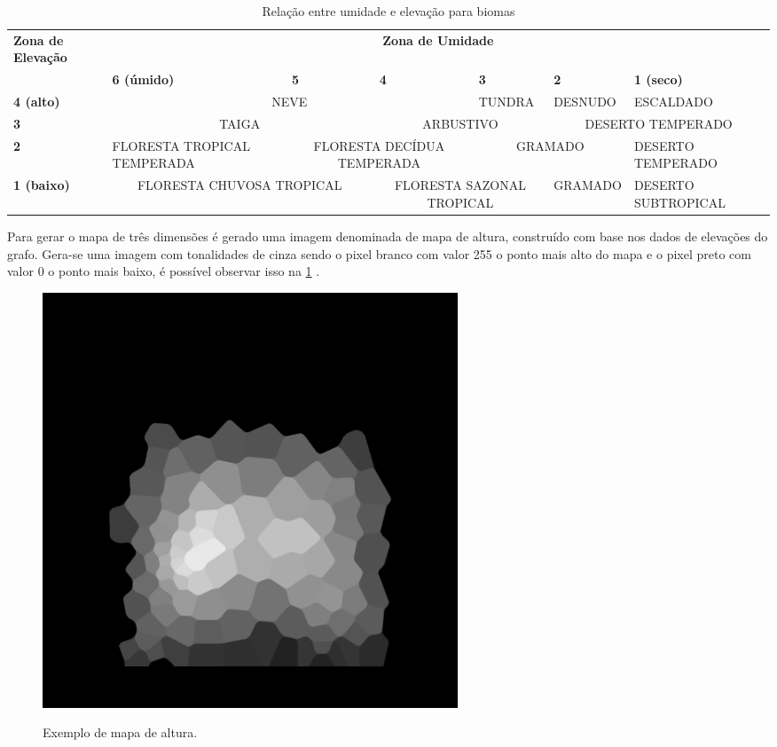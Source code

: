 \begin{table}
	\centering
	\caption{Relação entre umidade e elevação para biomas}
	\label{tab:biomes}
	\begin{tabularx}{\textwidth}{|X|X|X|X|X|X|X|}
	\hline
	\textbf{Zona de Elevação} & \multicolumn{6}{c|}{\textbf{Zona de Umidade}} \\
	\cline{2-7}
	 & \textbf{6 (úmido)} & \textbf{5} & \textbf{4} & \textbf{3} & \textbf{2} & \textbf{1 (seco)} \\
	\hline
	\textbf{4 (alto)} & \multicolumn{3}{|c|}{NEVE} & TUNDRA & DESNUDO & ESCALDADO  \\
	\hline
	\textbf{3} & \multicolumn{2}{|c|}{TAIGA} & \multicolumn{2}{|c|}{ARBUSTIVO} & \multicolumn{2}{|c|}{DESERTO TEMPERADO} \\
	\hline
	\textbf{2} & FLORESTA TROPICAL TEMPERADA & \multicolumn{2}{|c|}{FLORESTA DECÍDUA TEMPERADA} & \multicolumn{2}{|c|}{GRAMADO} & DESERTO TEMPERADO  \\
	\hline
	\textbf{1 (baixo)} &  \multicolumn{2}{|c|}{FLORESTA CHUVOSA TROPICAL} & \multicolumn{2}{|c|}{FLORESTA SAZONAL TROPICAL} & GRAMADO & DESERTO SUBTROPICAL  \\
	\hline
	\end{tabularx}
\end{table}

Para gerar o mapa de três dimensões é gerado uma imagem denominada de mapa de altura, construído com base nos dados de elevações do grafo. Gera-se uma imagem com tonalidades de cinza sendo o pixel branco com valor 255 o ponto mais alto do mapa e o pixel preto com valor 0 o ponto mais baixo, é possível observar isso na \cref{fig:heightmap} \cite{planetzoo}.

\begin{figure}[!ht]
	\centering
    \caption{Exemplo de mapa de altura.}
	\includegraphics[width=0.6\textwidth]{figures/heightmap_eample.png}
	\label{fig:heightmap}
\end{figure}

